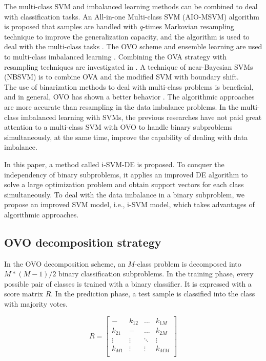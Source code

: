 The multi-class SVM and imbalanced learning methods can be combined to deal with classification tasks. An All-in-one Multi-class SVM (AIO-MSVM) algorithm is proposed that samples are handled with $q$-times Markovian resampling technique to improve the generalization capacity, and the algorithm is used to deal with the multi-class tasks \cite{DONG2023109720}. The OVO scheme and ensemble learning are used to multi-class imbalanced learning \cite{ZHANG2016251}. Combining the OVA strategy with resampling techniques are investigated in \cite{liao2008classification}. A technique of near-Bayesian SVMs (NBSVM) \cite{2015Near} is to combine OVA and the modified SVM with boundary shift. 
~\\

The use of binarization methods to deal with multi-class problems is beneficial, and in general, OVO has shown a better behavior \cite{2011An}. The algorithmic approaches are more accurate than resampling \cite{Fernndez2018LearningFI} in the data imbalance problems. In the multi-class imbalanced learning with SVMs, the previous researches have not paid great attention to a multi-class SVM with OVO to handle binary subproblems simultaneously, at the same time, improve the capability of dealing with data imbalance. 

In this paper, a method called i-SVM-DE is proposed. To conquer the independency of binary subproblems, it applies an improved DE algorithm to solve a large optimization problem and obtain support vectors for each class simultaneously. To deal with the data imbalance in a binary subproblem, we propose an improved SVM model, i.e., i-SVM model, which takes advantages of algorithmic approaches. 


\subsection{OVO decomposition strategy}
\label{OVO}

In the OVO decomposition scheme, an $M$-class problem is decomposed into $ M*(M-1)/2 $ binary classification subproblems. In the training phase, every possible pair of classes is trained with a binary classifier. It is expressed with a score matrix $R$. In the prediction phase, a test sample is classified into the class with majority votes. 

\begin{equation}
	R=
	\begin{bmatrix}
		- & k_{12} & ... & k_{1M} \\
		k_{21} & - & ... & k_{2M} \\
		\vdots & \vdots & \ddots & \vdots \\
		k_{M1} & \vdots & \vdots & k_{MM} \\
	\end{bmatrix}
\end{equation}

